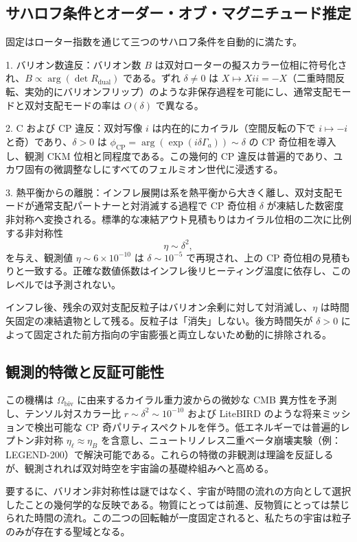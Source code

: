 \documentclass[a4paper]{article}
\begin{document}
\subsection{サハロフ条件とオーダー・オブ・マグニチュード推定}

固定はローター指数を通じて三つのサハロフ条件を自動的に満たす。

1. バリオン数違反：バリオン数 $B$ は双対ローターの擬スカラー位相に符号化され、$B \propto \arg(\det R_\text{dual})$ である。ずれ $\delta \neq 0$ は $X \mapsto X i i = -X$（二重時間反転、実効的にバリオンフリップ）のような非保存過程を可能にし、通常支配モードと双対支配モードの率は $O(\delta)$ で異なる。

2. C および CP 違反：双対写像 $i$ は内在的にカイラル（空間反転の下で $i \mapsto -i$ と奇）であり、$\delta > 0$ は $\phi_\text{CP} = \arg(\exp(i \delta \Gamma_a)) \sim \delta$ の CP 奇位相を導入し、観測 CKM 位相と同程度である。この幾何的 CP 違反は普遍的であり、ユカワ固有の微調整なしにすべてのフェルミオン世代に浸透する。

3. 熱平衡からの離脱：インフレ展開は系を熱平衡から大きく離し、双対支配モードが通常支配パートナーと対消滅する過程で CP 奇位相 $\delta$ が凍結した数密度非対称へ変換される。標準的な凍結アウト見積もりはカイラル位相の二次に比例する非対称性
\[
\eta \sim \delta^2,
\]
を与え、観測値 $\eta \sim 6 \times 10^{-10}$ は $\delta \sim 10^{-5}$ で再現され、上の CP 奇位相の見積もりと一致する。正確な数値係数はインフレ後リヒーティング温度に依存し、このレベルでは予測されない。

インフレ後、残余の双対支配反粒子はバリオン余剰に対して対消滅し、$\eta$ は時間矢固定の凍結遺物として残る。反粒子は「消失」しない。後方時間矢が $\delta > 0$ によって固定された前方指向の宇宙膨張と両立しないため動的に排除される。

\subsection{観測的特徴と反証可能性}

この機構は $\Omega_\text{biv}$ に由来するカイラル重力波からの微妙な CMB 異方性を予測し、テンソル対スカラー比 $r \sim \delta^2 \sim 10^{-10}$ および LiteBIRD のような将来ミッションで検出可能な CP 奇パリティスペクトルを伴う。低エネルギーでは普遍的レプトン非対称 $\eta_\ell \approx \eta_B$ を含意し、ニュートリノレス二重ベータ崩壊実験（例：LEGEND-200）で解決可能である。これらの特徴の非観測は理論を反証しるが、観測されれば双対時空を宇宙論の基礎枠組みへと高める。

要するに、バリオン非対称性は謎ではなく、宇宙が時間の流れの方向として選択したことの幾何学的な反映である。物質にとっては前進、反物質にとっては禁じられた時間の流れ。この二つの回転軸が一度固定されると、私たちの宇宙は粒子のみが存在する聖域となる。
\end{document}
